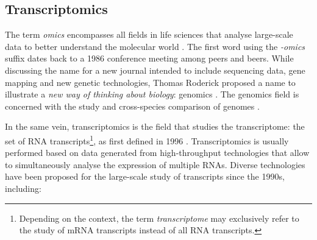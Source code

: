 \subsection{Transcriptomics}

The term \emph{omics} encompasses all fields in life sciences that analyse large-scale data to better understand the molecular world \cite{yadav:2007uy}. The first word using the \emph{-omics} suffix dates back to a 1986 conference meeting among peers and beers. While discussing the name for a new journal intended to include sequencing data, gene mapping and new genetic technologies, Thomas Roderick proposed a name to illustrate a \emph{new way of thinking about biology}: genomics \cite{yadav:2007uy,kuska:1998ta}. The genomics field is concerned with the study and cross-species comparison of genomes \cite{kuska:1998ta}.

In the same vein, transcriptomics is the field that studies the transcriptome: the set of RNA transcripts\footnote{Depending on the context, the term \emph{transcriptome} may exclusively refer to the study of mRNA transcripts instead of all RNA transcripts.}, as first defined in 1996 \cite{pietu:1999tl}. Transcriptomics is usually performed based on data generated from high-throughput technologies that allow to simultaneously analyse the expression of multiple RNAs. Diverse technologies have been proposed for the large-scale study of transcripts since the 1990s, including:

